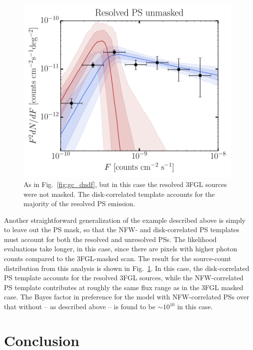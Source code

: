 \begin{figure}[htb]
\leavevmode
\begin{center}
\includegraphics[width=.8\textwidth]{ch-nptfit/dnds_unmasked.pdf}
\end{center}
\vspace{-.50cm}
\caption{As in Fig.~\ref{fig:gc_dndf}, but in this case the resolved 3FGL sources were not masked.  The disk-correlated template accounts for the majority of the resolved PS emission. }
\label{dNdF: unmasked}
\end{figure}   

Another straightforward generalization of the example described above is simply to leave out the PS mask, so that the NFW- and disk-correlated PS templates must account for both the resolved and unresolved PSs.  The likelihood evaluations take longer, in this case, since there are pixels with higher photon counts compared to the 3FGL-masked scan.  The result for the source-count distribution from this analysis is shown in Fig.~\ref{dNdF: unmasked}.  In this case, the disk-correlated PS template accounts for the resolved 3FGL sources, while the NFW-correlated PS template contributes at roughly the same flux range as in the 3FGL masked case.  The Bayes factor in preference for the model with NFW-correlated PSs over that without -- as described above -- is found to be $\sim$$10^{10}$ in this case.

\section{Conclusion}
\label{Conclusion}

